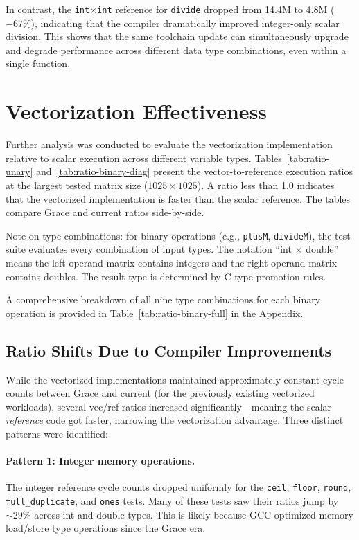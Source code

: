 In contrast, the \texttt{int$\times$int} reference for \texttt{divide} dropped from 14.4M to 4.8M ($-67\%$), indicating that the compiler dramatically improved integer-only scalar division. This shows that the same toolchain update can simultaneously upgrade and degrade performance across different data type combinations, even within a single function.

\section{Vectorization Effectiveness}

Further analysis was conducted to evaluate the vectorization implementation relative to scalar execution across different variable types. Tables~\ref{tab:ratio-unary} and~\ref{tab:ratio-binary-diag} present the vector-to-reference execution ratios at the largest tested matrix size ($1025 \times 1025$). A ratio less than 1.0 indicates that the vectorized implementation is faster than the scalar reference. The tables compare Grace and current ratios side-by-side.

Note on type combinations: for binary operations (e.g., \texttt{plusM}, \texttt{divideM}), the test suite evaluates every combination of input types. The notation ``int $\times$ double'' means the left operand matrix contains integers and the right operand matrix contains doubles. The result type is determined by C type promotion rules.





A comprehensive breakdown of all nine type combinations for each binary operation is provided in Table~\ref{tab:ratio-binary-full} in the Appendix.

\subsection{Ratio Shifts Due to Compiler Improvements}

While the vectorized implementations maintained approximately constant cycle counts between Grace and current (for the previously existing vectorized workloads), several vec/ref ratios increased significantly---meaning the scalar \emph{reference} code got faster, narrowing the vectorization advantage. Three distinct patterns were identified:

\paragraph{Pattern 1: Integer memory operations.} The integer reference cycle counts dropped uniformly for the \texttt{ceil}, \texttt{floor}, \texttt{round}, \texttt{full\_duplicate}, and \texttt{ones} tests. Many of these tests saw their ratios jump by $\sim 29\%$ across int and double types. This is likely because GCC optimized memory load/store type operations since the Grace era.


